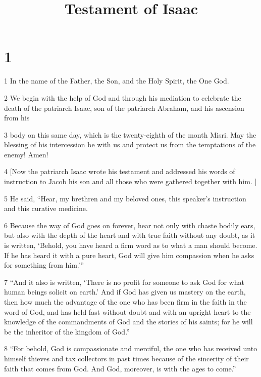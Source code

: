 


\title{Testament of Isaac}

\chapter{1}

\par 1 In the name of the Father, the Son, and the Holy Spirit, the One God. 

\par 2 We begin with the help of God and through his mediation to celebrate the death of the patriarch Isaac, son of the patriarch Abraham, and his ascension from his 

\par 3 body on this same day, which is the twenty-eighth of the month Misri. May the blessing of his intercession be with us and protect us from the temptations of the enemy! Amen! 

\par 4 [Now the patriarch Isaac wrote his testament and addressed his words of instruction to Jacob his son and all those who were gathered together with him. ]

\par 5 He said, “Hear, my brethren and my beloved ones, this speaker’s instruction and this curative medicine. 

\par 6 Because the way of God goes on forever, hear not only with chaste bodily ears, but also with the depth of the heart and with true faith without any doubt, as it is written, ‘Behold, you have heard a firm word as to what a man should become. If he has heard it with a pure heart, God will give him compassion when he asks for something from him.’” 

\par 7 “And it also is written, ‘There is no profit for someone to ask God for what  human beings solicit on earth.’ And if God has given us mastery on the earth, then how much the advantage of the one who has been firm in the faith in the word of God, and has held fast without doubt and with an upright heart to the knowledge of the commandments of God and the stories of his saints; for he will be the inheritor of the kingdom of God.” 

\par 8 “For behold, God is compassionate and merciful, the one who has received unto himself thieves and tax collectors in past times because of the sincerity of their faith that comes from God. And God, moreover, is with the ages to come.” 

